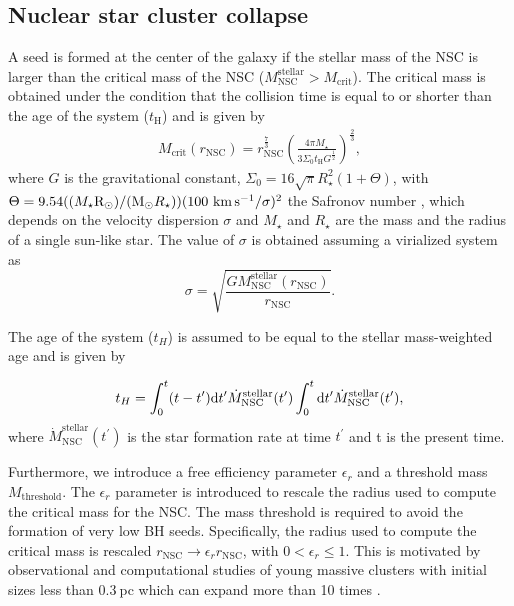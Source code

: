 \documentclass[baaa]{baaa}
\begin{document}
\subsection{Nuclear star cluster collapse}
A  seed is formed at the center of the galaxy if the stellar mass of the NSC  is larger than the critical mass of the NSC ($M_\mathrm{NSC}^\mathrm{stellar} > M_\mathrm{crit}$). The critical mass is obtained under the condition that the collision time is equal to or shorter than the age of the system ($t_\mathrm{H}$) and  is given by  \citep{VERGARA2023}
\begin{eqnarray}
M_\mathrm{crit} (r_\mathrm{NSC}) = r_\mathrm{NSC}^\frac{7}{3}\left( \frac{4\pi M_\star}{3\Sigma_0 t_\mathrm{H}G^\frac{1}{2}}\right)^\frac{2}{3},
\end{eqnarray}
 where $G$ is the gravitational constant, $\Sigma_0=16\sqrt{\pi}R_\star^2(1+\Theta)$, with $\Theta=9.54((M_\star {\rm R}_\odot )/({\rm M}_\odot R_\star ))( 100~\mathrm{km}\,\mathrm{s}^{-1} /\sigma)^2$  the Safronov number \citep{BINNEY2008}, which depends on the velocity dispersion $\sigma$ and $M_\star$ and  $R_\star$ are the mass and the radius of a single sun-like star. The value of $\sigma$ is obtained assuming a virialized system as 
\begin{equation}
\sigma= \sqrt{\frac{G M_\mathrm{NSC}^\mathrm{stellar}(r_\mathrm{NSC})}{r_\mathrm{NSC}}}.
\end{equation}

The age of the system ($t_H$) is assumed to be equal to the stellar mass-weighted age and is given by

\begin{equation}
t_H = \int_0^{t}(t-t^\prime){\rm d}t^\prime\dot{M}_\mathrm{NSC}^{\mathrm{stellar}}(t^\prime)\int_0^t{\rm d}t^\prime\dot{M}_\mathrm{NSC}^{\mathrm{stellar}}(t^\prime),
\end{equation}
where $\dot{M}_\mathrm{NSC}^{\mathrm{stellar}}(t^\prime)$ is the star formation rate at time $t^\prime$ and t is the present time.

Furthermore, we introduce a free efficiency parameter $\epsilon_r$  and a  threshold mass $M_\mathrm{threshold}$. The $\epsilon_r$  parameter is introduced to rescale the radius used to compute the critical mass for the NSC. The mass threshold is required to avoid the formation of very low BH seeds.  Specifically, the radius used to compute the critical mass is  rescaled $r_\mathrm{NSC}\rightarrow \epsilon_r r_\mathrm{NSC}$, with $0<\epsilon_r\leq1$. This is motivated by observational and computational studies of young massive clusters with initial sizes less than $0.3~$pc which can expand more than 10 times \citep{KROUPA2017}.
\end{document}
